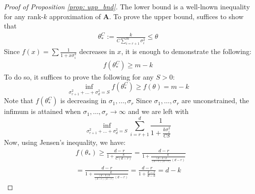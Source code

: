 \documentclass[conference]{IEEEtran}
\newcommand{\bA}{\mathbf{A}}
\begin{document}
\begin{proof}[Proof of Proposition \ref{prop: upp_bnd}]
The lower bound is a well-lnown inequality for any rank-$k$ approximation of $\bA$. 
To prove the upper bound,  suffices to show that 
\begin{align*}
    \theta^{C}_*:= \frac{k}{C\sum_{i = r + 1}^m \sigma_i^2} \le \theta
\end{align*}
Since $f(x) = \sum \frac{1}{1 + x \sigma_i^2}$ decreases in $x$, it is enough to demonstrate the following: 
\begin{align}\label{eq: f_ineq}
    f(\theta^C_*)  \ge m - k 
\end{align}
To do so, it suffices to prove the following for any  $S>0$: 
    $$\inf_{ \sigma_{r+1}^2 + \dots + \sigma_d^2 = S} f(\theta^C_*) \ge f(\theta) = m - k  $$
Note that $f(\theta^C_*)$ is decreasing in $\sigma_1,\dots, \sigma_r$
Since $\sigma_1,\dots,\sigma_r$ are unconstrained, the infimum is attained when $\sigma_1,\dots,\sigma_r \to \infty$ and we are left with $$\inf_{ \sigma_{r+1}^2 + \dots + \sigma_d^2 = S}  \sum_{i = r + 1}^d \frac{1}{1 + \frac{k\sigma_i^2}{CS}}$$ 
Now, using Jensen's inequality, we have:
\begin{align*}
    & f(\theta_*) \ge \frac{d-r}{1 + \frac{k}{C(d-r)}} = \frac{d-r}{1 + \frac{k}{\frac{(d-k)k}{(d-r)(k-r)}(d-r)}} \\
    & = \frac{d-r}{1 + \frac{k}{\frac{(d-k)k}{(d-r)(k-r)}(d-r)}} = \frac{d-r}{1 + \frac{k-r}{d-k}} = d - k
\end{align*}
\end{proof}
\end{document}
